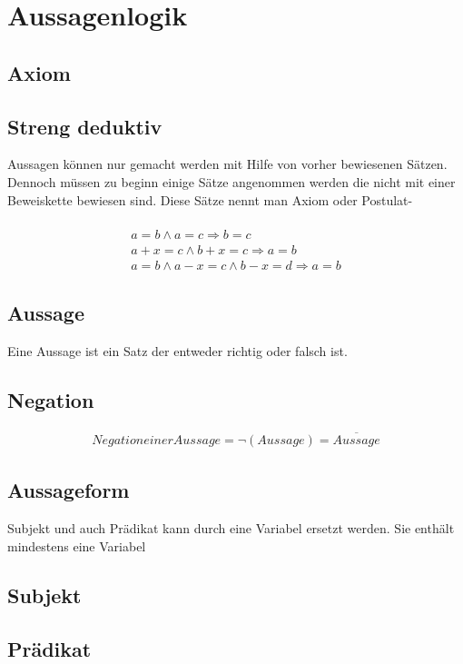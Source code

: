 \documentclass[a4paper]{scrartcl}
\begin{document}
\section{Aussagenlogik }

\subsection{Axiom}

\subsection{Streng deduktiv}
Aussagen können nur gemacht werden mit Hilfe von vorher bewiesenen Sätzen. Dennoch müssen zu beginn einige Sätze angenommen werden die nicht mit einer Beweiskette bewiesen sind. Diese Sätze nennt man Axiom oder Postulat- \\
\\
\begin{align}
a = b \wedge a=c \Rightarrow b=c\\
a+x=c \wedge b+x=c \Rightarrow a=b\\
a=b \wedge a-x=c \wedge b-x=d \Rightarrow a=b
\end{align}

\subsection{Aussage}
Eine Aussage ist ein Satz der entweder richtig oder falsch ist.

\subsection{Negation}
\begin{align}
Negation einer Aussage = \neg (Aussage) = \overline{Aussage}
\end{align}

\subsection{Aussageform}
Subjekt und auch Prädikat kann durch eine Variabel ersetzt werden. Sie enthält mindestens eine Variabel

\subsection{Subjekt}

\subsection{Prädikat}
\end{document}

